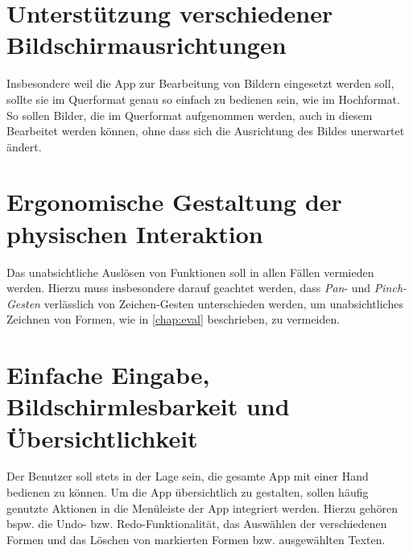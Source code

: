 \section{Unterstützung verschiedener Bildschirmausrichtungen}
Insbesondere weil die App zur Bearbeitung von Bildern eingesetzt werden soll, sollte sie im Querformat genau so einfach zu bedienen sein, wie im Hochformat.
So sollen Bilder, die im Querformat aufgenommen werden, auch in diesem Bearbeitet werden können, ohne dass sich die Ausrichtung des Bildes unerwartet ändert.

\section{Ergonomische Gestaltung der physischen Interaktion}
Das unabsichtliche Auslösen von Funktionen soll in allen Fällen vermieden werden.
Hierzu muss insbesondere darauf geachtet werden, dass \emph{Pan}- und \emph{Pinch-Gesten} verlässlich von Zeichen-Gesten unterschieden werden, um unabsichtliches Zeichnen von Formen, wie in \autoref{chap:eval} beschrieben, zu vermeiden.

\section{Einfache Eingabe, Bildschirmlesbarkeit und Übersichtlichkeit}
Der Benutzer soll stets in der Lage sein, die gesamte App mit einer Hand bedienen zu können.
Um die App übersichtlich zu gestalten, sollen häufig genutzte Aktionen in die Menüleiste der App integriert werden.
Hierzu gehören bspw. die Undo- bzw. Redo-Funktionalität, das Auswählen der verschiedenen Formen und das Löschen von markierten Formen bzw. ausgewählten Texten.



